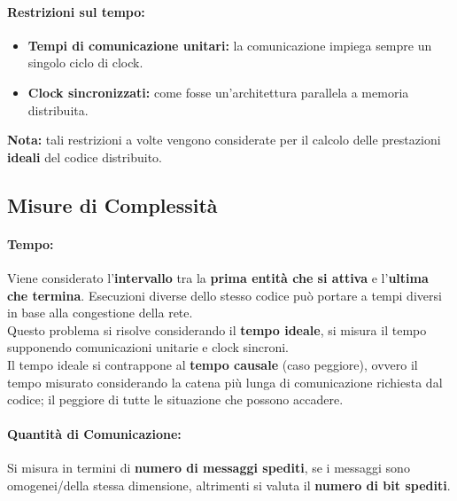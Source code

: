 \paragraph{Restrizioni sul tempo: }
\begin{itemize}
	\item \textbf{Tempi di comunicazione unitari:} la comunicazione impiega sempre un singolo ciclo di clock.\\
	
	\item \textbf{Clock sincronizzati:} come fosse un'architettura parallela a memoria distribuita.\\
\end{itemize}

\textbf{Nota:} tali restrizioni a volte vengono considerate per il calcolo delle prestazioni \textbf{ideali} del codice distribuito.\\

\newpage


\subsection{Misure di Complessità}

\paragraph{Tempo:} Viene considerato l'\textbf{intervallo} tra la \textbf{prima entità che si attiva} e l'\textbf{ultima che termina}. Esecuzioni diverse dello stesso codice può portare a tempi diversi in base alla congestione della rete.\\

Questo problema si risolve considerando il \textbf{tempo ideale}, si misura il tempo supponendo comunicazioni unitarie e clock sincroni.\\

Il tempo ideale si contrappone al \textbf{tempo causale} (caso peggiore), ovvero il tempo misurato considerando la catena più lunga di comunicazione richiesta dal codice; il peggiore di tutte le situazione che possono accadere.\\

\paragraph{Quantità di Comunicazione:} Si misura in termini di \textbf{numero di messaggi spediti}, se i messaggi sono omogenei/della stessa dimensione, altrimenti si valuta il \textbf{numero di bit spediti}.\\

